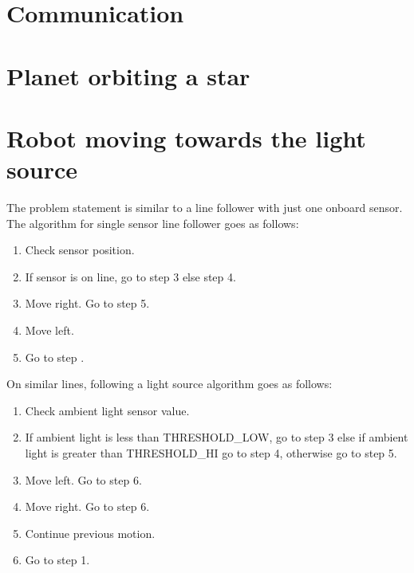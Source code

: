\documentclass{article}
\begin{document}
\section{Communication}

\section{Planet orbiting a star}

\section{Robot moving towards the light source}
The problem statement is similar to a line follower with just one onboard sensor. The algorithm for single sensor line follower goes as follows:
\begin{enumerate}
	\item Check sensor position.
	\item If sensor is on line, go to step 3 else step 4.
	\item Move right. Go to step 5.
	\item Move left.
	\item Go to step .
\end{enumerate}
On similar lines, following a light source algorithm goes as follows:
\begin{enumerate}
	\item Check ambient light sensor value.
	\item If ambient light is less than THRESHOLD\_LOW, go to step 3 else if ambient light is greater than THRESHOLD\_HI go to step 4, otherwise go to step 5.
	\item Move left. Go to step 6.
	\item Move right. Go to step 6.
	\item Continue previous motion.
	\item Go to step 1.
\end{enumerate}
\end{document}
